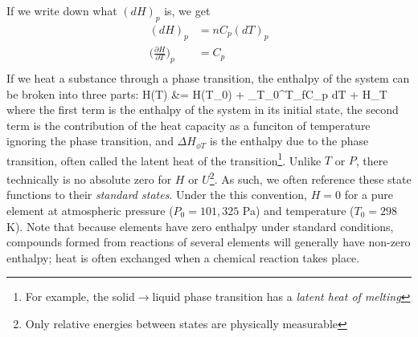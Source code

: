 \documentclass[12pt]{article}
\begin{document}
If we write down what $(dH)_p$ is, we get
\begin{align*}
(dH)_p &= n C_p (dT)_p\\
\Big(\frac{\partial H}{\partial T}\Big)_p &= C_p\\
\end{align*}
If we heat a substance through a phase transition, the enthalpy of the system can be broken into three parts:
\eqs
H(T) &= H(T_0) +  \int_{T_0}^{T_f}C_p  dT + \Delta H_{\phi T}
\eqe
where the first term is the enthalpy of the system in its initial state, the second term is the contribution of the heat capacity as a funciton of temperature ignoring the phase transition, and $\Delta H_{\phi T}$ is the enthalpy due to the phase transition, often called the latent heat of the transition\footnote{For example, the solid$\to$liquid phase transition has a \emph{latent heat of melting}}.  Unlike $T$ or $P$, there technically is no absolute zero for $H$ or $U$\footnote{Only relative energies between states are physically measurable}.  As such, we often reference these state functions to their \emph{standard states}. Under the this convention, $H=0$ for a pure element at atmospheric pressure ($P_0 = 101,325$ Pa) and temperature ($T_0 = 298$ K). Note that because elements have zero enthalpy under standard conditions, compounds formed from reactions of several elements will generally have non-zero enthalpy; heat is often exchanged when a chemical reaction takes place.\\
\end{document}
